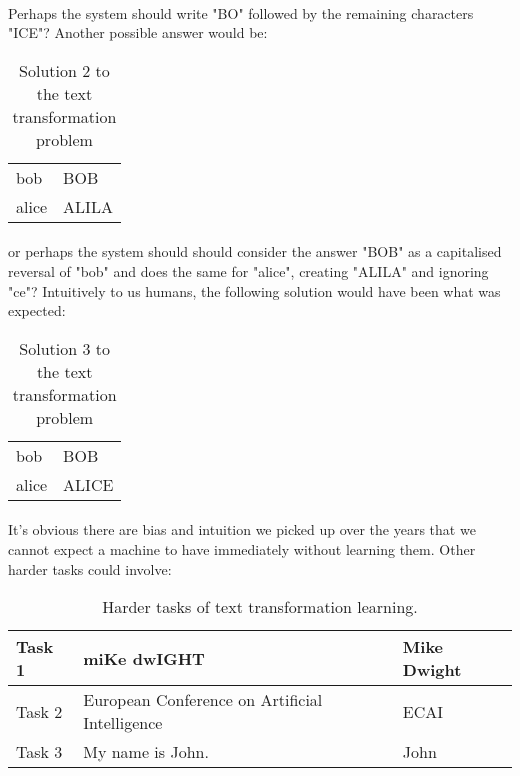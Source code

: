 \documentclass{article}
\theoremstyle{plain}
\theoremstyle{definition}
\begin{document}
\begin{multicols}{2}
\paragraph{} Perhaps the system should write "BO" followed by the remaining characters "ICE"? Another possible answer would be:

\begin{table}[H]
\centering\footnotesize
\begin{tabular}{ | l | l | }
\hline
bob & BOB \\
alice & ALILA\\
\hline
\end{tabular}
\caption{Solution 2 to the text transformation problem}\label{table:MILTextTransformation3}
\end{table}


\paragraph{} or perhaps the system should should consider the answer "BOB" as a capitalised reversal of "bob" and does the same for "alice", creating "ALILA" and ignoring "ce"? Intuitively to us humans, the following solution would have been what was expected:

\begin{table}[H]
\centering\footnotesize
\begin{tabular}{ | l | l | }
\hline
bob & BOB \\
alice & ALICE\\
\hline
\end{tabular}
\caption{Solution 3 to the text transformation problem}\label{table:MILTextTransformation3}
\end{table}

\paragraph{} It's obvious there are bias and intuition we picked up over the years that we cannot expect a machine to have immediately without learning them. Other harder tasks could involve:

\begin{table}[H]
\centering\footnotesize
\begin{tabular}{ | l | p{3.2cm} | l | }
\hline
Task 1 & miKe dwIGHT & Mike Dwight \\
\hline
Task 2 & European Conference on Artificial Intelligence & ECAI \\
\hline
Task 3 & My name is John. & John \\
\hline
\end{tabular}
\caption{Harder tasks of text transformation learning.}\label{table:MILTextTransformation3}
\end{table}


\end{multicols}
\end{document}
